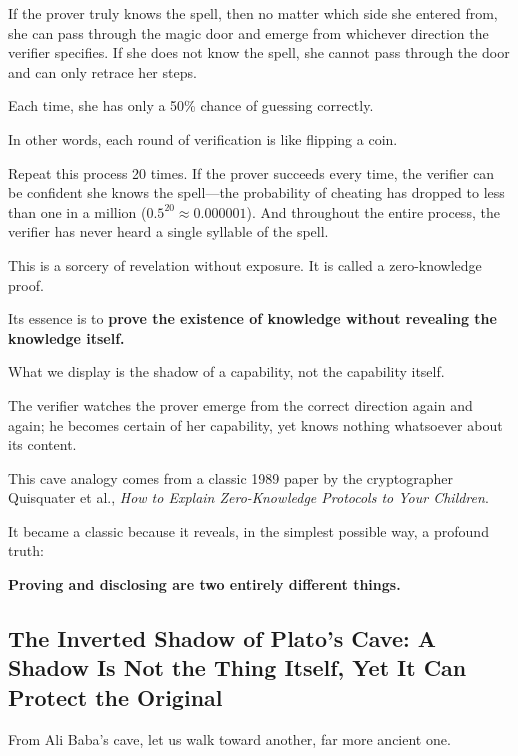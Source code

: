 If the prover truly knows the spell, then no matter which side she entered from, she can pass through the magic door and emerge from whichever direction the verifier specifies. If she does not know the spell, she cannot pass through the door and can only retrace her steps.

Each time, she has only a 50\% chance of guessing correctly.

\vspace{1em}

In other words, each round of verification is like flipping a coin.

Repeat this process 20 times. If the prover succeeds every time, the verifier can be confident she knows the spell---the probability of cheating has dropped to less than one in a million ($0.5^{20} \approx 0.000001$). And throughout the entire process, the verifier has never heard a single syllable of the spell.

\vspace{1em}

This is a sorcery of revelation without exposure. It is called a zero-knowledge proof.

Its essence is to \textbf{prove the existence of knowledge without revealing the knowledge itself.}

What we display is the shadow of a capability, not the capability itself.

The verifier watches the prover emerge from the correct direction again and again; he becomes certain of her capability, yet knows nothing whatsoever about its content.

\begin{myquote}
This cave analogy comes from a classic 1989 paper by the cryptographer Quisquater et al., \textit{How to Explain Zero-Knowledge Protocols to Your Children}.

It became a classic because it reveals, in the simplest possible way, a profound truth:

\textbf{Proving and disclosing are two entirely different things.}

\end{myquote}

\newpage
\subsection{The Inverted Shadow of Plato's Cave: A Shadow Is Not the Thing Itself, Yet It Can Protect the Original}

From Ali Baba's cave, let us walk toward another, far more ancient one.

